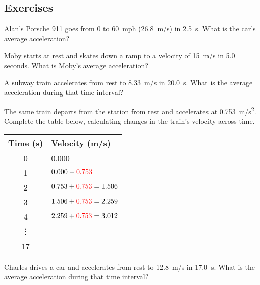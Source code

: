 \documentclass[main-physics.tex]{subfiles}
\begin{document}
\subsection{Exercises}

\begin{exercise} \label{eBsToU}
    Alan's Porsche 911 goes from 0 to \SI{60}{mph} (\SI{26.8}{m/s}) in \SI{2.5}{s}. What is the car's average acceleration? 
\end{exercise}


\begin{exercise} \label{kVZPeG}
  Moby starts at rest and skates down a ramp to a velocity of \SI{15}{m/s} in 5.0 seconds. What is Moby's average acceleration? 
\end{exercise}

\begin{exercise} \label{Vth5N8}
    A subway train accelerates from rest to \SI{8.33}{m/s} in \SI{20.0}{s}. What is the average acceleration during that time interval?
\end{exercise}

\begin{exercise}
    The same train departs from the station from rest and accelerates at \SI{0.753}{m/s^2}. Complete the table below, calculating changes in the train's velocity across time.

\begin{center}
    \begin{tabular}{c|l}
        \textbf{Time (s)} & \textbf{Velocity (m/s)} \\
        \hline
        0 & 0.000\\
        1 & $0.000 + {\color{red}0.753}$\\
        2 & $0.753 + {\color{red}0.753} = 1.506$ \\
        3 & $1.506 + {\color{red}0.753} = 2.259$ \\
        4 & $2.259 + {\color{red}0.753} = 3.012$ \\
        \vdots &  \\
        17 &  \\
    \end{tabular}
\end{center}
\end{exercise}


\begin{exercise} \label{XSJU8b}
    Charles drives a car and accelerates from rest to \SI{12.8}{m/s} in \SI{17.0}{s}. What is the average acceleration during that time interval?
\end{exercise}
\end{document}
